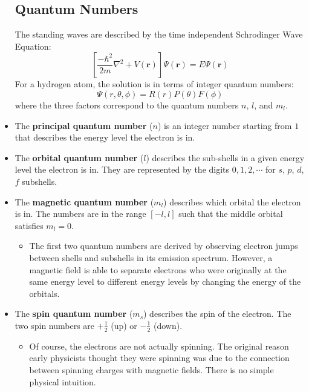 \documentclass{article}
\begin{document}
\begin{itemize}
    \subsection{Quantum Numbers}
    \begin{idea}
        The standing waves are described by the time independent Schrodinger Wave Equation:
        $${\displaystyle \left[{\frac {-\hbar ^{2}}{2m}}\nabla ^{2}+V(\mathbf {r} )\right]\Psi (\mathbf {r} )=E\Psi (\mathbf {r} )}$$
        For a hydrogen atom, the solution is in terms of integer quantum numbers:
        $$\Psi(r,\theta,\phi) =  R(r)P(\theta)F(\phi)$$
        where the three factors correspond to the quantum numbers $n$, $l$, and $m_l$.
    \end{idea}
    \item The \textbf{principal quantum number} ($n$) is an integer number starting from $1$ that describes the energy level the electron is in.
    \item The \textbf{orbital quantum number} ($l$) describes the sub-shells in a given energy level the electron is in. They are represented by the digits $0,1,2,\cdots$ for $s$, $p$, $d$, $f$ subshells.
    \item The \textbf{magnetic quantum number} ($m_l$) describes which orbital the electron is in. The numbers are in the range $[-l,l]$ such that the middle orbital satisfies $m_l=0$.
    \begin{itemize}
        \item The first two quantum numbers are derived by observing electron jumps between shells and subshells in its emission spectrum. However, a magnetic field is able to separate electrons who were originally at the same energy level to different energy levels by changing the energy of the orbitals.
    \end{itemize}
    \item The \textbf{spin quantum number} ($m_s$) describes the spin of the electron. The two spin numbers are $+\frac{1}{2}$ (up) or $-\frac{1}{2}$ (down).
    \begin{itemize}
        \item Of course, the electrons are not actually spinning. The original reason early physicists thought they were spinning was due to the connection between spinning charges with magnetic fields. There is no simple physical intuition.
    \end{itemize}

\end{itemize}
\end{document}
